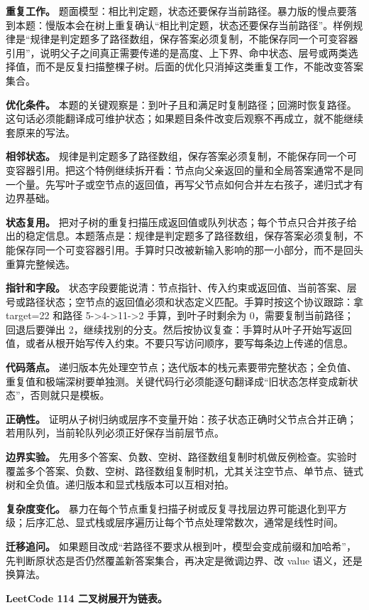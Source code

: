 \textbf{重复工作。} 题面模型：相比判定题，状态还要保存当前路径。暴力版的慢点要落到本题：慢版本会在树上重复确认“相比判定题，状态还要保存当前路径”。样例规律是“规律是判定题多了路径数组，保存答案必须复制，不能保存同一个可变容器引用”，说明父子之间真正需要传递的是高度、上下界、命中状态、层号或两类选择值，而不是反复扫描整棵子树。后面的优化只消掉这类重复工作，不能改变答案集合。

\textbf{优化条件。} 本题的关键观察是：到叶子且和满足时复制路径；回溯时恢复路径。这句话必须能翻译成可维护状态；如果题目条件改变后观察不再成立，就不能继续套原来的写法。

\textbf{相邻状态。} 规律是判定题多了路径数组，保存答案必须复制，不能保存同一个可变容器引用。把这个特例继续拆开看：节点向父亲返回的量和全局答案通常不是同一个量。先写叶子或空节点的返回值，再写父节点如何合并左右孩子，递归式才有边界基础。

\textbf{状态复用。} 把对子树的重复扫描压成返回值或队列状态；每个节点只合并孩子给出的稳定信息。本题落点是：规律是判定题多了路径数组，保存答案必须复制，不能保存同一个可变容器引用。手算时只改被新输入影响的那一小部分，而不是回头重算完整候选。

\textbf{指针和字段。} 状态字段要能说清：节点指针、传入约束或返回值、当前答案、层号或路径状态；空节点的返回值必须和状态定义匹配。手算时按这个协议跟踪：拿 target=22 和路径 5->4->11->2 手算，到叶子时剩余为 0，需要复制当前路径；回退后要弹出 2，继续找别的分支。然后按协议复查：手算时从叶子开始写返回值，或者从根开始写传入约束。不要只写访问顺序，要写每条边上传递的信息。

\textbf{代码落点。} 递归版本先处理空节点；迭代版本的栈元素要带完整状态；全负值、重复值和极端深树要单独测。关键代码行必须能逐句翻译成“旧状态怎样变成新状态”，否则就只是模板。

\textbf{正确性。} 证明从子树归纳或层序不变量开始：孩子状态正确时父节点合并正确；若用队列，当前轮队列必须正好保存当前层节点。

\textbf{边界实验。} 先用多个答案、负数、空树、路径数组复制时机做反例检查。实验时覆盖多个答案、负数、空树、路径数组复制时机，尤其关注空节点、单节点、链式树和全负值。递归版本和显式栈版本可以互相对拍。

\textbf{复杂度变化。} 暴力在每个节点重复扫描子树或反复寻找层边界可能退化到平方级；后序汇总、显式栈或层序遍历让每个节点处理常数次，通常是线性时间。

\textbf{迁移追问。} 如果题目改成“若路径不要求从根到叶，模型会变成前缀和加哈希”，先判断原状态是否仍然覆盖新答案集合，再决定是微调边界、改 value 语义，还是换算法。

\noindent\textbf{LeetCode 114 二叉树展开为链表。}

